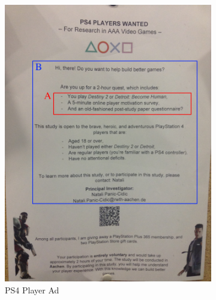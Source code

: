 \documentclass[a4paper,11pt,oneside]{scrreprt}
\begin{document}
\begin{figure}[H]
	\centering
	\begin{subfigure}{.5\textwidth}
		\centering
		\includegraphics[clip, trim=0cm 0cm 0cm 0cm, scale=0.12]{./images/recruitment2.jpeg}
		\caption{PS4 Player Ad}
	\end{subfigure}%
	\begin{subfigure}{.5\textwidth}
		\centering

\end{subfigure}
\end{figure}
\end{document}
